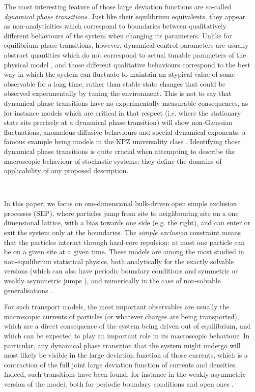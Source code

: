 \documentclass[aps,pre,onecolumn,showpacs,showkeys,a4paper]{revtex4-1}
\begin{document}
The most interesting feature of those large deviation functions are so-called \textit{dynamical phase transitions}. Just like their equilibrium equivalents, they appear as non-analyticities which correspond to boundaries between qualitatively different behaviours of the system when changing its parameters. Unlike for equilibrium phase transitions, however, dynamical control parameters are usually abstract quantities which do not correspond to actual tunable parameters of the physical model \cite{Jack2015a}, and those different qualitative behaviours correspond to the best way in which the system can fluctuate to maintain an atypical value of some observable for a long time, rather than stable state changes that could be observed experimentally by tuning the environment. This is not to say that dynamical phase transitions have no experimentally measurable consequences, as for instance models which are critical in that respect (i.e. where the stationary state sits precisely at a dynamical phase transition) will show non-Gaussian fluctuations, anomalous diffusive behaviours and special dynamical exponents, a famous example being models in the KPZ universality class \cite{Spohn2016,Corwin2016}. Identifying those dynamical phase transitions is quite crucial when attempting to describe the macroscopic behaviour of stochastic systems: they define the domains of applicability of any proposed description.

~~

In this paper, we focus on one-dimensional bulk-driven open simple exclusion processes (SEP), where particles jump from site to neighbouring site on a one dimensional lattice, with a bias towards one side (e.g. the right), and can enter or exit the system only at the boundaries. The \textit{simple exclusion} constraint means that the particles interact through hard-core repulsion: at most one particle can be on a given site at a given time. These models are among the most studied in non-equilibrium statistical physics, both analytically for the exactly solvable versions \cite{derrida1993exact,1751-8121-40-46-R01,Lazarescu2015} (which can also have periodic boundary conditions \cite{derrida1998exact,Prolhac2009} and symmetric or weakly asymmetric jumps \cite{Enaud2004,Prolhac2009a}), and numerically in the case of non-solvable generalisations \cite{1742-5468-2008-06-P06009,Greulich2008,Ciandrini2010}.

For such transport models, the most important observables are usually the macroscopic currents of particles (or whatever charges are being transported), which are a direct consequence of the system being driven out of equilibrium, and which can be expected to play an important role in its macroscopic behaviour. In particular, any dynamical phase transition that the system might undergo will most likely be visible in the large deviation function of those currents, which is a contraction of the full joint large deviation function of currents and densities. Indeed, such transitions have been found, for instance in the weakly asymmetric version of the model, both for periodic boundary conditions \cite{PhysRevE.72.066110,Bodineau2008,appert2008universal,Simon2011,Espigares2013} and open ones \cite{Lecomte2010,Baek2016a}.
\end{document}
